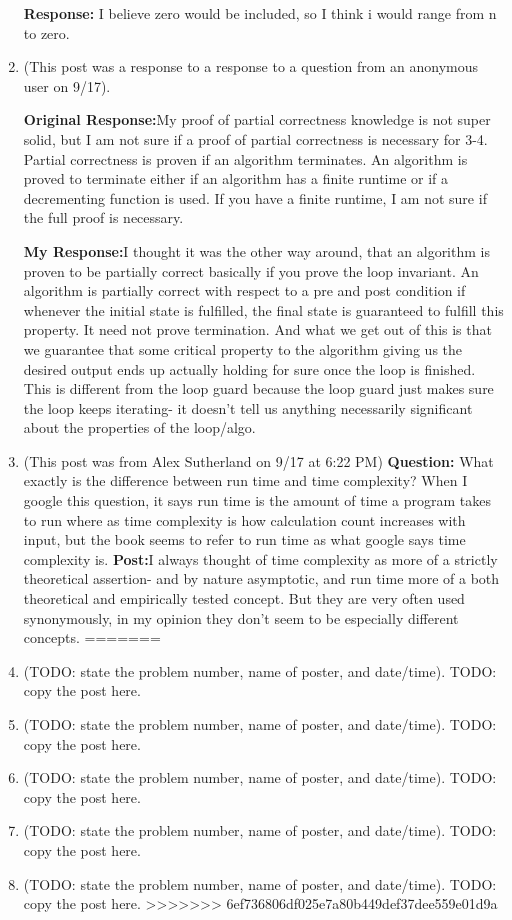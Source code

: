 \documentclass{article}
\begin{document}
\begin{enumerate}
		\textbf{Response:}
		I believe zero would be included, so I think i would range from n to zero.

    \item (This post was a response to a response to a question from an anonymous user on 9/17).
	    
	    \textbf{Original Response:}My proof of partial correctness knowledge is not super solid, but I am not sure if a 
		proof of partial correctness is necessary for 3-4. Partial correctness is proven if an algorithm 
		terminates. An algorithm is proved to terminate either if an algorithm has a finite runtime or if a decrementing 
		function is used. If you have a finite runtime, I am not sure if the full proof is necessary. 
	  
	    \textbf{My Response:}I thought it was the other way around, 
	    that an algorithm is proven to be partially correct basically if you 
	    prove the loop invariant. An 
	    algorithm is partially correct with respect to a pre and post condition if whenever the initial state is fulfilled, the final state 
	    is guaranteed to fulfill this property. It need not prove termination. And what we get out of this is that we guarantee that 
	    some critical property to the algorithm giving us the desired output ends up actually holding for sure once the loop is 
	    finished. This is different from the loop guard because the loop guard just makes sure the 
	    loop keeps iterating- it doesn't tell us anything necessarily significant about the properties of the loop/algo.
\item (This post was from  Alex Sutherland on 9/17 at 6:22 PM) \textbf{Question:}
	What exactly is the difference between run time and time complexity? When I google this question, 
		it says run time is the amount of time a program takes to run where as time complexity is 
		how calculation count increases with input, but the book seems to refer to 
		run time as what google says time complexity is.
	\textbf{Post:}I always thought of time complexity as 
	    more of a strictly theoretical assertion- and by nature asymptotic, and run 
		time more of a both theoretical and empirically tested concept. But 
		they are very often used synonymously, in my opinion they don't 
		seem to be especially different concepts.
=======
    \item (TODO: state the problem number, name of poster, and date/time). TODO:
        copy the post here.
    \item (TODO: state the problem number, name of poster, and date/time). TODO:
        copy the post here.
    \item (TODO: state the problem number, name of poster, and date/time). TODO:
        copy the post here.
    \item (TODO: state the problem number, name of poster, and date/time). TODO:
        copy the post here.
    \item (TODO: state the problem number, name of poster, and date/time). TODO:
        copy the post here.
>>>>>>> 6ef736806df025e7a80b449def37dee559e01d9a
\end{enumerate}
\end{document}
